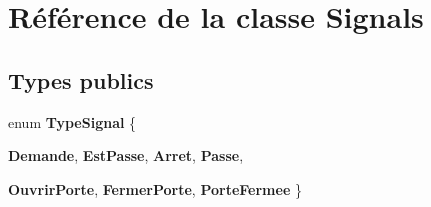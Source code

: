 \hypertarget{classSignals}{
\section{Référence de la classe Signals}
\label{classSignals}
}
\subsection*{Types publics}
\begin{DoxyCompactItemize}
\item 
enum {\bfseries TypeSignal} \{ \par
{\bfseries Demande}, 
{\bfseries EstPasse}, 
{\bfseries Arret}, 
{\bfseries Passe}, 
\par
{\bfseries OuvrirPorte}, 
{\bfseries FermerPorte}, 
{\bfseries PorteFermee}
 \}
\end{DoxyCompactItemize}
